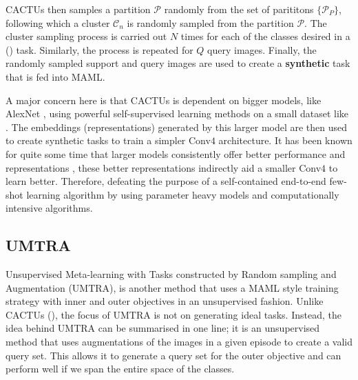 CACTUs then samples a partition $\mathcal{P}$ randomly from the set of parititons $\{\mathcal{P}_P\}$, following which a cluster $\mathcal{C}_n$ is randomly sampled from the partition $\mathcal{P}$. The cluster sampling process is carried out $N$ times for each of the classes desired in a () task. Similarly, the process is repeated for $Q$ query images. Finally, the randomly sampled support and query images are used to create a \textbf{synthetic} task that is fed into MAML.

A major concern here is that CACTUs is dependent on bigger models, like AlexNet \parencite{AlexNet2012}, using powerful self-supervised learning methods on a small dataset like \miniImagenet{}. The embeddings (representations) generated by this larger model are then used to create synthetic tasks to train a simpler Conv$4$ architecture. It has been known for quite some time that larger models consistently offer better performance and representations \parencite{Dosovitskiy2020, He2015}, these better representations indirectly aid a smaller Conv$4$ to learn better. Therefore, defeating the purpose of a self-contained end-to-end few-shot learning algorithm by using parameter heavy models and computationally intensive algorithms.

\subsection{UMTRA} \label{ssec:umtra}

Unsupervised Meta-learning with Tasks constructed by Random sampling and Augmentation (UMTRA), is another method that uses a MAML style training strategy with inner and outer objectives in an unsupervised fashion.
Unlike CACTUs (), the focus of UMTRA is not on generating ideal tasks. 
Instead, the idea behind UMTRA can be summarised in one line; it is an unsupervised method that uses augmentations of the images in a given episode to create a valid query set. This allows it to generate a  query set for the outer objective and can perform well if we span the entire space of the classes.

